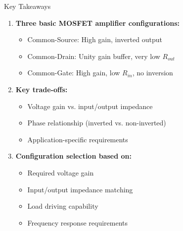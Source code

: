 \documentclass[10pt, aspectratio=169]{beamer}
\begin{document}
\begin{frame}{Key Takeaways}
\begin{enumerate}
\item \textbf{Three basic MOSFET amplifier configurations:}
   \begin{itemize}
   \item Common-Source: High gain, inverted output
   \item Common-Drain: Unity gain buffer, very low $R_{out}$
   \item Common-Gate: High gain, low $R_{in}$, no inversion
   \end{itemize}

\vspace{0.3cm}
\item \textbf{Key trade-offs:}
   \begin{itemize}
   \item Voltage gain vs. input/output impedance
   \item Phase relationship (inverted vs. non-inverted)
   \item Application-specific requirements
   \end{itemize}

\vspace{0.3cm}
\item \textbf{Configuration selection based on:}
   \begin{itemize}
   \item Required voltage gain
   \item Input/output impedance matching
   \item Load driving capability
   \item Frequency response requirements
   \end{itemize}
\end{enumerate}
\end{frame}

\end{document}
